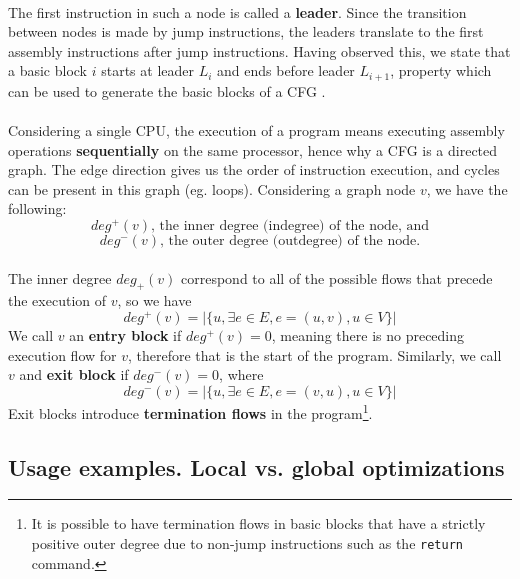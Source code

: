 \paragraph*{}
The first instruction in such a node is called a \textbf{leader}. Since the transition between nodes is made by jump instructions, the leaders translate to the first assembly instructions after jump instructions. Having observed this, we state that a basic block $i$ starts at leader $L_i$ and ends before leader $L_{i+1}$, property which can be used to generate the basic blocks of a CFG \cite{cfg-dcc}.

\paragraph*{}
Considering a single CPU, the execution of a program means executing assembly operations \textbf{sequentially} on the same processor, hence why a CFG is a directed graph. The edge direction gives us the order of instruction execution, and cycles can be present in this graph (eg. loops). Considering a graph node $v$, we have the following:
$$deg^+(v) \textrm{, the inner degree (indegree) of the node, and}$$
$$deg^-(v) \textrm{, the outer degree (outdegree) of the node.}$$

\paragraph*{}
The inner degree $deg_+(v)$ correspond to all of the possible flows that precede the execution of $v$, so we have
$$deg^+(v) = |\{u, \exists e \in E, e=(u, v), u \in V\}|$$
We call $v$ an \textbf{entry block} if $deg^+(v)=0$, meaning there is no preceding execution flow for $v$, therefore that is the start of the program. Similarly, we call $v$ and \textbf{exit block} if $deg^-(v)=0$, where
$$deg^-(v) = |\{u, \exists e \in E, e=(v, u), u \in V\}|$$
Exit blocks introduce \textbf{termination flows} in the program\footnote{It is possible to have termination flows in basic blocks that have a strictly positive outer degree due to non-jump instructions such as the \lstinline[columns=fixed]{return} command.}.

\subsection{Usage examples. Local vs. global optimizations}
